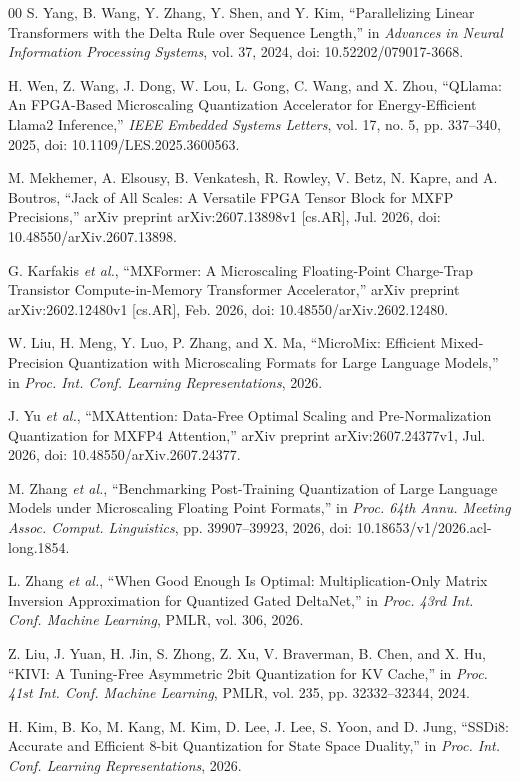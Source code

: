 \documentclass[conference]{IEEEtran}
\begin{document}
\begin{thebibliography}{00}
S. Yang, B. Wang, Y. Zhang, Y. Shen, and Y. Kim, ``Parallelizing Linear
Transformers with the Delta Rule over Sequence Length,'' in \emph{Advances in
Neural Information Processing Systems}, vol. 37, 2024, doi:
10.52202/079017-3668.

H. Wen, Z. Wang, J. Dong, W. Lou, L. Gong, C. Wang, and X. Zhou,
``QLlama: An FPGA-Based Microscaling Quantization Accelerator for
Energy-Efficient Llama2 Inference,'' \emph{IEEE Embedded Systems Letters},
vol. 17, no. 5, pp. 337--340, 2025, doi: 10.1109/LES.2025.3600563.

M. Mekhemer, A. Elsousy, B. Venkatesh, R. Rowley, V. Betz, N. Kapre, and
A. Boutros, ``Jack of All Scales: A Versatile FPGA Tensor Block for MXFP
Precisions,'' arXiv preprint arXiv:2607.13898v1 [cs.AR], Jul. 2026, doi:
10.48550/arXiv.2607.13898.

G. Karfakis \emph{et al.}, ``MXFormer: A Microscaling Floating-Point
Charge-Trap Transistor Compute-in-Memory Transformer Accelerator,'' arXiv
preprint arXiv:2602.12480v1 [cs.AR], Feb. 2026, doi:
10.48550/arXiv.2602.12480.

W. Liu, H. Meng, Y. Luo, P. Zhang, and X. Ma, ``MicroMix: Efficient
Mixed-Precision Quantization with Microscaling Formats for Large Language
Models,'' in \emph{Proc. Int. Conf. Learning Representations}, 2026.

J. Yu \emph{et al.}, ``MXAttention: Data-Free Optimal Scaling and
Pre-Normalization Quantization for MXFP4 Attention,'' arXiv preprint
arXiv:2607.24377v1, Jul. 2026, doi: 10.48550/arXiv.2607.24377.

M. Zhang \emph{et al.}, ``Benchmarking Post-Training Quantization of Large
Language Models under Microscaling Floating Point Formats,'' in \emph{Proc.
64th Annu. Meeting Assoc. Comput. Linguistics}, pp. 39907--39923, 2026, doi:
10.18653/v1/2026.acl-long.1854.

L. Zhang \emph{et al.}, ``When Good Enough Is Optimal: Multiplication-Only
Matrix Inversion Approximation for Quantized Gated DeltaNet,''
in \emph{Proc. 43rd Int. Conf. Machine Learning}, PMLR, vol. 306, 2026.

Z. Liu, J. Yuan, H. Jin, S. Zhong, Z. Xu, V. Braverman, B. Chen, and X. Hu,
``KIVI: A Tuning-Free Asymmetric 2bit Quantization for KV Cache,'' in
\emph{Proc. 41st Int. Conf. Machine Learning}, PMLR, vol. 235,
pp. 32332--32344, 2024.

H. Kim, B. Ko, M. Kang, M. Kim, D. Lee, J. Lee, S. Yoon, and D. Jung,
``SSDi8: Accurate and Efficient 8-bit Quantization for State Space Duality,''
in \emph{Proc. Int. Conf. Learning Representations}, 2026.
\end{thebibliography}
\end{document}
